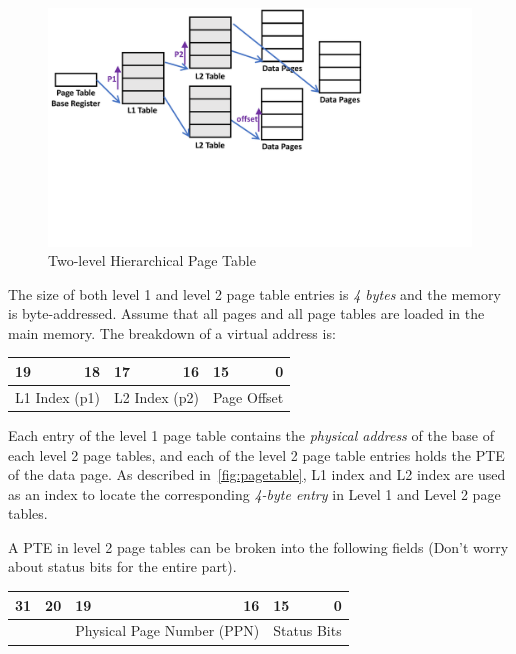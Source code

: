 \documentclass[addpoints, 12pt, answers]{exam}
\begin{document}
\begin{questions}
\begin{figure}[h]
	\centering
	\includegraphics[width=0.8\columnwidth]{fig/pagetable.pdf}
	\caption{Two-level Hierarchical Page Table}\label{fig:pagetable}
\end{figure}


The size of both level 1 and level 2 page table entries is {\em 4 bytes} and the memory is byte-addressed. 
Assume that all pages and all page tables are loaded in the main memory. 
The breakdown of a virtual address is:

\begin{table}[h]
	\centering
	\begin{tabular}{lrlrlr}
	19 & 18 & 17 & 16 & 15 & 0 \\ \hline
	\multicolumn{2}{|c|}{L1 Index (p1)} & \multicolumn{2}{c|}{L2 Index (p2)} & \multicolumn{2}{c|}{\quad\quad\quad Page Offset \quad\quad\quad} \\ \hline
	\end{tabular}
\end{table}


Each entry of the level 1 page table contains the {\em physical address} of the base of each level 2 page tables, 
and each of the level 2 page table entries holds the PTE of the data page. 
As described in~\autoref{fig:pagetable}, L1 index and L2 index are used as an index 
to locate the corresponding {\em 4-byte entry} in Level 1 and Level 2 page tables.

A PTE in level 2 page tables can be broken into the following fields (Don’t worry about status
bits for the entire part).

\begin{table}[h]
	\centering
	\begin{tabular}{lrlrlr}
	31 & 20 & 19 & 16 & 15 & 0 \\ \hline
	\multicolumn{2}{|c|}{\quad\quad\quad\quad\quad\quad\quad\quad 0 \quad\quad\quad\quad\quad\quad\quad\quad} & \multicolumn{2}{c|}{Physical Page Number (PPN)} & \multicolumn{2}{c|}{Status Bits} \\ \hline
	\end{tabular}
\end{table}



\end{questions}
\end{document}
